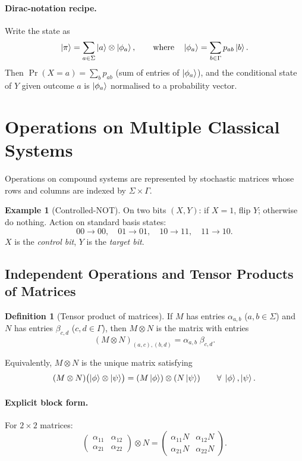 \documentclass[11pt]{article}
\theoremstyle{definition}
\newtheorem{definition}{Definition}[section]
\newtheorem{example}{Example}[section]
\begin{document}
\paragraph{Dirac-notation recipe.}  Write the state as
\[
    \ket{\pi} = \sum_{a\in\Sigma}\ket{a}\otimes\ket{\phi_a},
    \qquad\text{where}\quad
    \ket{\phi_a}=\sum_{b\in\Gamma}p_{ab}\ket{b}.
\]
Then $\Pr(X=a)=\sum_b p_{ab}$ (sum of entries of $\ket{\phi_a}$), and the conditional state of $Y$ given outcome $a$ is $\ket{\phi_a}$ normalised to a probability vector.

\section{Operations on Multiple Classical Systems}

Operations on compound systems are represented by stochastic matrices whose rows and columns are indexed by $\Sigma\times\Gamma$.

\begin{example}[Controlled-NOT]
On two bits $(X,Y)$: if $X=1$, flip $Y$; otherwise do nothing.  Action on standard basis states:
\[
    00\to 00,\quad 01\to 01,\quad 10\to 11,\quad 11\to 10.
\]
$X$ is the \emph{control bit}, $Y$ is the \emph{target bit}.
\end{example}

\subsection{Independent Operations and Tensor Products of Matrices}

\begin{definition}[Tensor product of matrices]
If $M$ has entries $\alpha_{a,b}$ ($a,b\in\Sigma$) and $N$ has entries $\beta_{c,d}$ ($c,d\in\Gamma$), then $M\otimes N$ is the matrix with entries
\[
    (M\otimes N)_{(a,c),(b,d)} = \alpha_{a,b}\;\beta_{c,d}.
\]
\end{definition}

Equivalently, $M\otimes N$ is the unique matrix satisfying
\[
    (M\otimes N)\bigl(\ket{\phi}\otimes\ket{\psi}\bigr)
    = (M\ket{\phi})\otimes(N\ket{\psi})
    \qquad\forall\;\ket{\phi},\ket{\psi}.
\]

\paragraph{Explicit block form.}  For $2\times 2$ matrices:
\[
    \begin{pmatrix}\alpha_{11}&\alpha_{12}\\\alpha_{21}&\alpha_{22}\end{pmatrix}
    \otimes N
    = \begin{pmatrix}\alpha_{11}N&\alpha_{12}N\\\alpha_{21}N&\alpha_{22}N\end{pmatrix}.
\]
\end{document}
